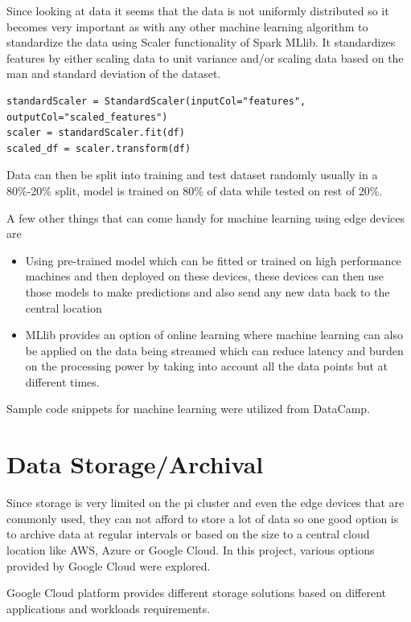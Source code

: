 Since looking at data it seems that the data is not uniformly
distributed so it becomes very important as with any other machine
learning algorithm to standardize the data using Scaler functionality
of Spark MLlib. It standardizes features by either scaling data to
unit variance and/or scaling data based on the man and standard
deviation of the dataset.

\begin{verbatim}
standardScaler = StandardScaler(inputCol="features", outputCol="scaled_features")
scaler = standardScaler.fit(df)
scaled_df = scaler.transform(df)
\end{verbatim}

Data can then be split into training and test dataset randomly usually in a 80\%-20\% split, model is trained on 80\% of data while tested on rest of 20\%. 

A few other things that can come handy for machine learning using edge devices are

\begin{itemize}
\item Using pre-trained model which can be fitted or trained on high
  performance machines and then deployed on these devices, these
  devices can then use those models to make predictions and also send
  any new data back to the central location
\item MLlib provides an option of online learning where machine
  learning can also be applied on the data being streamed which can
  reduce latency and burden on the processing power by taking into
  account all the data points but at different times.
\end{itemize}

Sample code snippets for machine learning were utilized from
DataCamp\cite{hid-sp18-510-dc}.

\section{Data Storage/Archival}

Since storage is very limited on the pi cluster and even the edge
devices that are commonly used, they can not afford to store a lot of
data so one good option is to archive data at regular intervals or
based on the size to a central cloud location like AWS, Azure or
Google Cloud. In this project, various options provided by Google
Cloud were explored.

Google Cloud platform provides different storage solutions based on
different applications and workloads requirements.

